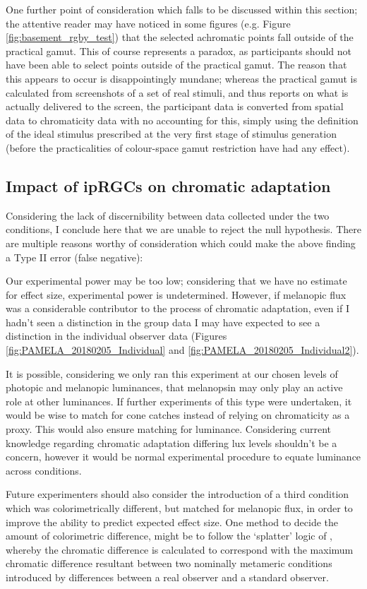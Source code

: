 One further point of consideration which falls to be discussed within this section; the attentive reader may have noticed in some figures (e.g. Figure \ref{fig:basement_rgby_test}) that the selected achromatic points fall outside of the practical gamut. This of course represents a paradox, as participants should not have been able to select points outside of the practical gamut. The reason that this appears to occur is disappointingly mundane; whereas the practical gamut is calculated from screenshots of a set of real stimuli, and thus reports on what is actually delivered to the screen, the participant data is converted from spatial data to chromaticity data with no accounting for this, simply using the definition of the ideal stimulus prescribed at the very first stage of stimulus generation (before the practicalities of colour-space gamut restriction have had any effect).

\subsection{Impact of ipRGCs on chromatic adaptation}

Considering the lack of discernibility between data collected under the two conditions, I conclude here that we are unable to reject the null hypothesis. There are multiple reasons worthy of consideration which could make the above finding a Type II error (false negative): 

Our experimental power may be too low; considering that we have no estimate for effect size, experimental power is undetermined. However, if melanopic flux was a considerable contributor to the process of chromatic adaptation, even if I hadn't seen a distinction in the group data I may have expected to see a distinction in the individual observer data (Figures \ref{fig:PAMELA_20180205_Individual} and \ref{fig:PAMELA_20180205_Individual2}).

It is possible, considering we only ran this experiment at our chosen levels of photopic and melanopic luminances, that melanopsin may only play an active role at other luminances. If further experiments of this type were undertaken, it would be wise to match for cone catches instead of relying on chromaticity as a proxy. This would also ensure matching for luminance. Considering current knowledge regarding chromatic adaptation differing lux levels shouldn't be a concern, however it would be normal experimental procedure to equate luminance across conditions.

Future experimenters should also consider the introduction of a third condition which was colorimetrically different, but matched for melanopic flux, in order to improve the ability to predict expected effect size. One method to decide the amount of colorimetric difference, might be to follow the `splatter' logic of \citet{spitschan_human_2016}, whereby the chromatic difference is calculated to correspond with the maximum chromatic difference resultant between two nominally metameric conditions introduced by differences between a real observer and a standard observer.


